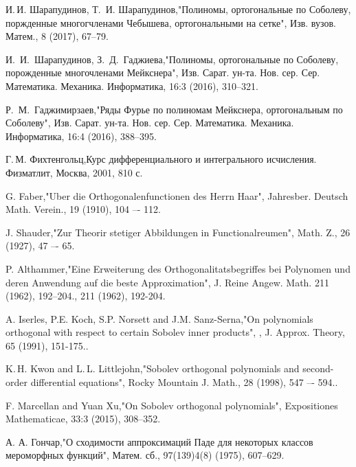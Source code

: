\begin{thebibliography}{20}
И.\,И. Шарапудинов, Т.\, И. Шарапудинов,"Полиномы, ортогональные по Соболеву, поржденные многогчленами Чебышева, ортогональными на сетке", Изв. вузов. Матем., 8 (2017), 67--79.



И.~И.~Шарапудинов, З.~Д.~Гаджиева,"Полиномы, ортогональные по Соболеву, порожденные многочленами Мейкснера", Изв. Сарат. ун-та. Нов. сер. Сер. Математика. Механика. Информатика, 16:3 (2016), 310--321.



Р.~М.~Гаджимирзаев,"Ряды Фурье по полиномам Мейкснера, ортогональным по Соболеву", Изв. Сарат. ун-та. Нов. сер. Сер. Математика. Механика. Информатика, 16:4 (2016), 388--395.



Г.\,М. Фихтенгольц,Курс дифференциального и интегрального исчисления. Физматлит, Москва, 2001, 810 с.




G. Faber,"Uber die Orthogonalenfunctionen des Herrn Haar", Jahresber. Deutsch Math. Verein., 19 (1910), 104 –- 112.



J. Shauder,"Zur Theorir stetiger Abbildungen in Functionalreumen", Math. Z., 26 (1927), 47 –- 65.



P. Althammer,"Eine Erweiterung des Orthogonalitatsbegriffes bei Polynomen und deren Anwendung  auf die beste Approximation", J. Reine Angew. Math. 211 (1962), 192–204., 211 (1962), 192-204.



A. Iserles, P.E. Koch, S.P. Norsett and J.M. Sanz-Serna,"On polynomials  orthogonal  with respect  to certain Sobolev inner products", ,  J. Approx. Theory, 65 (1991), 151-175..



K.\,H. Kwon and L.\,L. Littlejohn,"Sobolev orthogonal polynomials and second-order differential equations", Rocky Mountain J. Math., 28 (1998), 547 –- 594..



F. Marcellan and Yuan Xu,"On Sobolev orthogonal polynomials", Expositiones Mathematicae, 33:3 (2015), 308--352.



А. А. Гончар,"О сходимости аппроксимаций Паде для некоторых классов мероморфных функций", Матем. сб., 97(139)4(8) (1975), 607–629.




\end{thebibliography}

